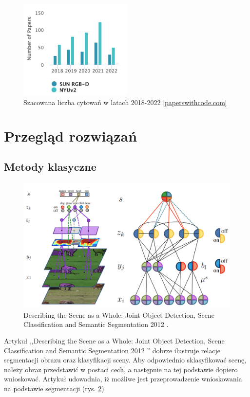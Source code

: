 \begin{figure}
    \centering
    \includegraphics[width=0.5\textwidth]{images/stats-dataset.png}
    \caption[]{Szacowana liczba cytowań w latach 2018-2022 \href{https://paperswithcode.com/dataset/sun-rgb-d}{[paperswithcode.com]}}
    \label{fig:sun-vs-nyu}
\end{figure}

\section{Przegląd rozwiązań}
\subsection{Metody klasyczne}
\begin{figure}
    \includegraphics[width=\textwidth]{images/joint-segmentation-and-classification.png}
    \caption{Describing the Scene as a Whole: Joint Object Detection, Scene Classification and Semantic Segmentation 2012 \cite{yao2012describing}.}
    \label{fig:old-school-arch}
\end{figure}

Artykuł ,,Describing the Scene as a Whole: Joint Object Detection, Scene Classification and Semantic Segmentation 2012 \cite{yao2012describing}'' dobrze ilustruje relacje segmentacji obrazu oraz klasyfikacji sceny. Aby odpowiednio sklasyfikować scenę, należy obraz przedstawić w postaci cech, a następnie na tej podstawie dopiero wnioskować. Artykuł \cite{yao2012describing} udowadnia, iż możliwe jest przeprowadzenie wnioskowania na podstawie segmentacji (rys. \ref{fig:old-school-arch}).

